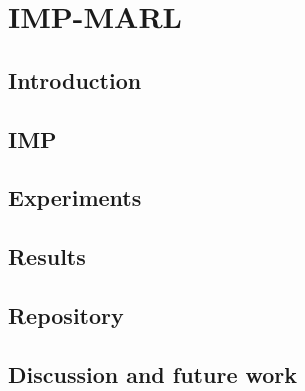 \chapter{IMP-MARL}\label{ch:impmarl}

\section{Introduction}
\section{IMP}
\section{Experiments}
\section{Results}
\section{Repository}
\section{Discussion and future work}